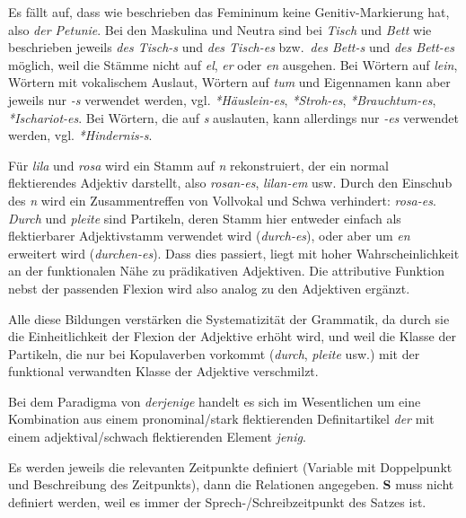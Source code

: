 
Es fällt auf, dass wie beschrieben das Femininum keine Genitiv-Markierung hat, also \textit{der Petunie}.
Bei den Maskulina und Neutra sind bei \textit{Tisch} und \textit{Bett} wie beschrieben jeweils \textit{des Tisch-s} und \textit{des Tisch-es} bzw.\ \textit{des Bett-s} und \textit{des Bett-es} möglich, weil die Stämme nicht auf \textit{el}, \textit{er} oder \textit{en} ausgehen.
Bei Wörtern auf \textit{lein}, Wörtern mit vokalischem Auslaut, Wörtern auf \textit{tum} und Eigennamen kann aber jeweils nur \textit{-s} verwendet werden, vgl. \textit{*Häuslein-es}, \textit{*Stroh-es}, \textit{*Brauchtum-es}, \textit{*Ischariot-es}.
Bei Wörtern, die auf \textit{s} auslauten, kann allerdings nur \textit{-es} verwendet werden, vgl. \textit{*Hindernis-s}.


Für \textit{lila} und \textit{rosa} wird ein Stamm auf \textit{n} rekonstruiert, der ein normal flektierendes Adjektiv darstellt, also \textit{rosan-es}, \textit{lilan-em} usw.
Durch den Einschub des \textit{n} wird ein Zusammentreffen von Vollvokal und Schwa verhindert: \textit{\Ast rosa-es}.\\
\textit{Durch} und \textit{pleite} sind Partikeln, deren Stamm hier entweder einfach als flektierbarer Adjektivstamm verwendet wird (\textit{durch-es}), oder aber um \textit{en} erweitert wird (\textit{durchen-es}).
Dass dies passiert, liegt mit hoher Wahrscheinlichkeit an der funktionalen Nähe zu prädikativen Adjektiven.
Die attributive Funktion nebst der passenden Flexion wird also analog zu den Adjektiven ergänzt.

Alle diese Bildungen verstärken die Systematizität der Grammatik, da durch sie die Einheitlichkeit der Flexion der Adjektive erhöht wird, und weil die Klasse der Partikeln, die nur bei Kopulaverben vorkommt (\textit{durch}, \textit{pleite} usw.) mit der funktional verwandten Klasse der Adjektive verschmilzt.


Bei dem Paradigma von \textit{derjenige} handelt es sich im Wesentlichen um eine Kombination aus einem pronominal\slash stark flektierenden Definitartikel \textit{der} mit einem adjektival\slash schwach flektierenden Element \textit{jenig}.



Es werden jeweils die relevanten Zeitpunkte definiert (Variable mit Doppelpunkt und Beschreibung des Zeitpunkts), dann die Relationen angegeben.
\textbf{S} muss nicht definiert werden, weil es immer der Sprech-/Schreibzeitpunkt des Satzes ist.

